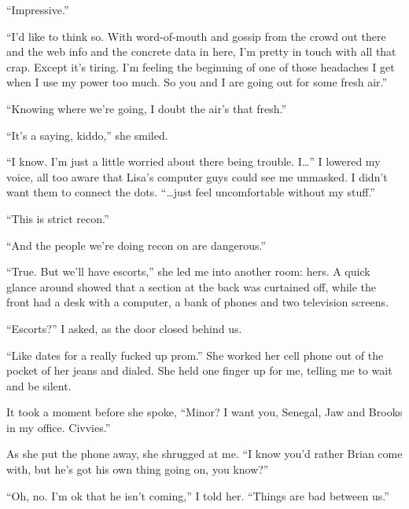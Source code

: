``Impressive.''



``I'd like to think so.  With word-of-mouth and gossip from the crowd out there and the web info and the concrete data in here, I'm pretty in touch with all that crap.  Except it's tiring.  I'm feeling the beginning of one of those headaches I get when I use my power too much.  So you and I are going out for some fresh air.''



``Knowing where we're going, I doubt the air's that fresh.''



``It's a saying, kiddo,'' she smiled.



``I know.  I'm just a little worried about there being trouble.  I\ldots'' I lowered my voice, all too aware that Lisa's computer guys could see me unmasked.  I didn't want them to connect the dots.  ``\ldots{}just feel uncomfortable without my stuff.''



``This is strict recon.''



``And the people we're doing recon on are dangerous.''



``True.  But we'll have escorts,'' she led me into another room: hers.  A quick glance around showed that a section at the back was curtained off, while the front had a desk with a computer, a bank of phones and two television screens.



``Escorts?'' I asked, as the door closed behind us.



``Like dates for a really fucked up prom.''  She worked her cell phone out of the pocket of her jeans and dialed. She held one finger up for me, telling me to wait and be silent.



It took a moment before she spoke, ``Minor?  I want you, Senegal, Jaw and Brooks in my office.  Civvies.''



As she put the phone away, she shrugged at me.  ``I know you'd rather Brian come with, but he's got his own thing going on, you know?''



``Oh, no.  I'm ok that he isn't coming,'' I told her.  ``Things are bad between us.''




